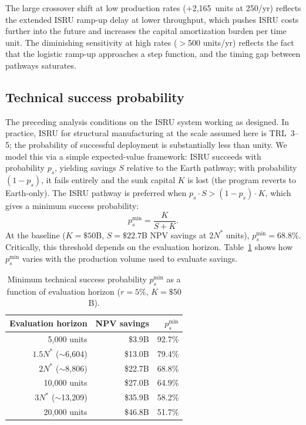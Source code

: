 \documentclass[preprint,12pt]{elsarticle}
\begin{document}
The large crossover shift at low production rates ($+$2{,}165~units at 250/yr) reflects the extended ISRU ramp-up delay at lower throughput, which pushes ISRU costs further into the future and increases the capital amortization burden per time unit. The diminishing sensitivity at high rates ($>$500 units/yr) reflects the fact that the logistic ramp-up approaches a step function, and the timing gap between pathways saturates.

\subsection{Technical success probability}
\label{sec:success_probability}

The preceding analysis conditions on the ISRU system working as designed. In practice, ISRU for structural manufacturing at the scale assumed here is TRL~3--5; the probability of successful deployment is substantially less than unity. We model this via a simple expected-value framework: ISRU succeeds with probability $p_s$, yielding savings $S$ relative to the Earth pathway; with probability $(1 - p_s)$, it fails entirely and the sunk capital $K$ is lost (the program reverts to Earth-only). The ISRU pathway is preferred when $p_s \cdot S > (1 - p_s) \cdot K$, which gives a minimum success probability:
\begin{equation}
  p_s^{\min} = \frac{K}{S + K}.
  \label{eq:p_success}
\end{equation}
At the baseline ($K = \$50$B, $S = \$22.7$B NPV savings at $2N^*$ units), $p_s^{\min} = 68.8\%$. Critically, this threshold depends on the evaluation horizon. Table~\ref{tab:ps_horizon} shows how $p_s^{\min}$ varies with the production volume used to evaluate savings.

\begin{table}[htbp]
\centering
\caption{Minimum technical success probability $p_s^{\min}$ as a function of evaluation horizon ($r = 5\%$, $K = \$50$B).}
\label{tab:ps_horizon}
\small
\begin{tabular}{@{}rrr@{}}
\toprule
Evaluation horizon & NPV savings & $p_s^{\min}$ \\
\midrule
5{,}000 units            & \$3.9B   & 92.7\% \\
$1.5 N^*$ ($\sim$6{,}604) & \$13.0B  & 79.4\% \\
$2 N^*$ ($\sim$8{,}806)   & \$22.7B  & 68.8\% \\
10{,}000 units           & \$27.0B  & 64.9\% \\
$3 N^*$ ($\sim$13{,}209)  & \$35.9B  & 58.2\% \\
20{,}000 units           & \$46.8B  & 51.7\% \\
\bottomrule
\end{tabular}
\end{table}
\end{document}
